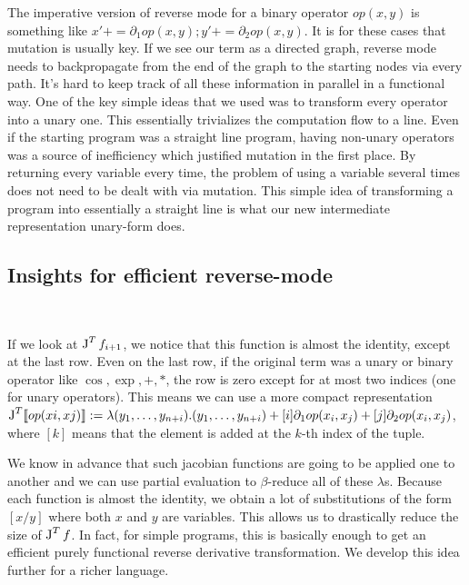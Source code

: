 The imperative version of reverse mode for a binary operator $op(x,y)$ is something like $x'+= \partial_1op(x,y);y'+= \partial_2op(x,y)$. 
It is for these cases that mutation is usually key. 
If we see our term as a directed graph, reverse mode needs to backpropagate from the end of the graph to the starting nodes via every path.
It's hard to keep track of all these information in parallel in a functional way.
One of the key simple ideas that we used was to transform every operator into a unary one. 
This essentially trivializes the computation flow to a line. 
Even if the starting program was a straight line program, 
having non-unary operators was a source of inefficiency which justified mutation in the first place.
By returning every variable every time, the problem of using a variable several times does not need to be dealt with via mutation. 
This simple idea of transforming a program into essentially a straight line is what our new intermediate representation unary-form does. 

\subsection{Insights for efficient reverse-mode}\
\label{subsec:insights}

If we look at $\operatorname{J}^Tf_{i+1}$, we notice that this function is almost the identity, except at the last row. 
Even on the last row, if the original term was a unary or binary operator like $\cos, \exp, +, *$, 
the row is zero except for at most two indices (one for unary operators).
This means we can use a more compact representation $\operatorname{J}^T\llbracket op(xi,xj)\rrbracket:=\lambda (y_1,\ldots,y_{n+i}).(y_1,\ldots,y_{n+i})+[i]\partial_1op(x_i, x_j)+[j]\partial_2op(x_i, x_j)$, 
where $[k]$ means that the element is added at the $k$-th index of the tuple.

We know in advance that such jacobian functions are going to be applied one to another and we can use partial evaluation to $\beta$-reduce all of these $\lambda$s.
Because each function is almost the identity, we obtain a lot of substitutions of the form $[x/y]$ where both $x$ and $y$ are variables. 
This allows us to drastically reduce the size of $\operatorname{J}^Tf$. In fact, for simple programs, this is basically enough to get an efficient purely functional reverse derivative transformation.
We develop this idea further for a richer language.

